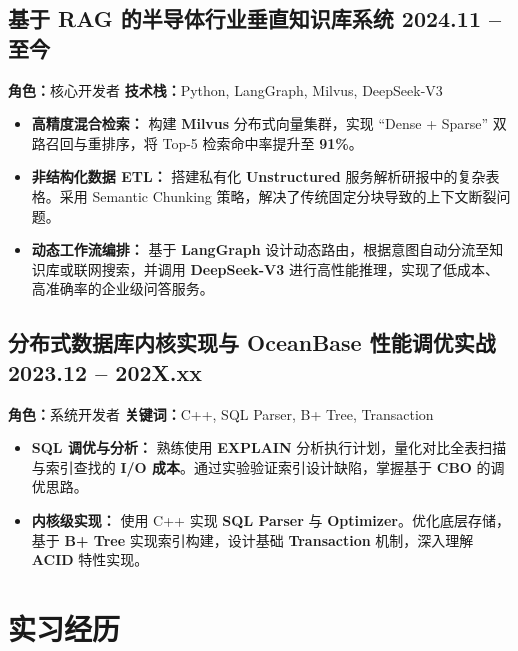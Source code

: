\documentclass[10pt]{article}
\begin{document}
\subsection{\texorpdfstring{基于 RAG 的半导体行业垂直知识库系统 \hfill \rm{\small 2024.11 -- 至今}}{基于 RAG 的半导体行业垂直知识库系统}}
\vspace{0.1em}
\small{\textbf{角色：}核心开发者 \quad \textbf{技术栈：}Python, LangGraph, Milvus, DeepSeek-V3}
\vspace{0.2em}
\begin{itemize}
    \item \textbf{高精度混合检索：} 构建 \textbf{Milvus} 分布式向量集群，实现 ``Dense + Sparse'' 双路召回与重排序，将 Top-5 检索命中率提升至 \textbf{91\%}。
    \item \textbf{非结构化数据 ETL：} 搭建私有化 \textbf{Unstructured} 服务解析研报中的复杂表格。采用 Semantic Chunking 策略，解决了传统固定分块导致的上下文断裂问题。
    \item \textbf{动态工作流编排：} 基于 \textbf{LangGraph} 设计动态路由，根据意图自动分流至知识库或联网搜索，并调用 \textbf{DeepSeek-V3} 进行高性能推理，实现了低成本、高准确率的企业级问答服务。
\end{itemize}

\subsection{\texorpdfstring{分布式数据库内核实现与 OceanBase 性能调优实战 \hfill \rm{\small 2023.12 -- 202X.xx}}{分布式数据库内核实现与 OceanBase 性能调优实战}}
\vspace{0.1em}
\small{\textbf{角色：}系统开发者 \quad \textbf{关键词：}C++, SQL Parser, B+ Tree, Transaction}
\vspace{0.2em}
\begin{itemize}
    \item \textbf{SQL 调优与分析：} 熟练使用 \textbf{EXPLAIN} 分析执行计划，量化对比全表扫描与索引查找的 \textbf{I/O 成本}。通过实验验证索引设计缺陷，掌握基于 \textbf{CBO} 的调优思路。
    \item \textbf{内核级实现：} 使用 C++ 实现 \textbf{SQL Parser} 与 \textbf{Optimizer}。优化底层存储，基于 \textbf{B+ Tree} 实现索引构建，设计基础 \textbf{Transaction} 机制，深入理解 \textbf{ACID} 特性实现。
\end{itemize}

\section{\texorpdfstring{\makebox[\widthof{\faBriefcase}][c]{\color{NPU_Blue}{\normalfont\faBriefcase}}\quad 实习经历}{实习经历}}
\end{document}
